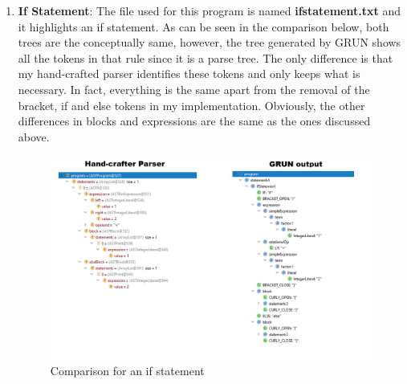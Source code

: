 \documentclass{article}
\begin{document}
\begin{enumerate}
					\item \textbf{If Statement}: The file used for this program is named \textbf{ifstatement.txt} and it highlights an if statement. As can be seen in the comparison below, both trees are the conceptually same, however, the tree generated by GRUN shows all the tokens in that rule since it is a parse tree. The only difference is that my hand-crafted parser identifies these tokens and only keeps what is necessary.  In fact, everything is the same apart from the removal of the bracket, if and else tokens in my implementation. Obviously, the other differences in blocks and expressions are the same as the ones discussed above.
						\begin{figure}[H]
					\centering
			 			\includegraphics[width=\textwidth]{compareif.png}
			  			\caption{Comparison for an if statement}
			  			\label{fig:comapareif}
					\end{figure}
					

\end{enumerate}
\end{document}
